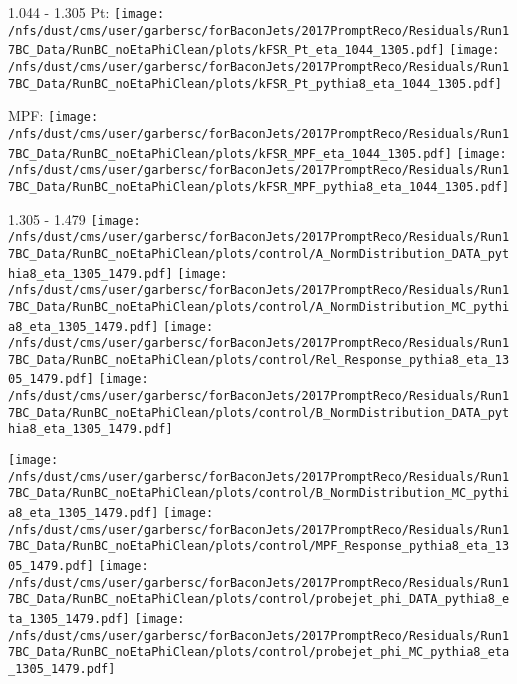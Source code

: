 \documentclass[t,compress]{beamer}
\begin{document}
\begin{frame}{1.044 - 1.305}
	 Pt: \texttt{[image: /nfs/dust/cms/user/garbersc/forBaconJets/2017PromptReco/Residuals/Run17BC\_Data/RunBC\_noEtaPhiClean/plots/kFSR\_Pt\_eta\_1044\_1305.pdf]}
	\texttt{[image: /nfs/dust/cms/user/garbersc/forBaconJets/2017PromptReco/Residuals/Run17BC\_Data/RunBC\_noEtaPhiClean/plots/kFSR\_Pt\_pythia8\_eta\_1044\_1305.pdf]}
\newline

	 MPF: \texttt{[image: /nfs/dust/cms/user/garbersc/forBaconJets/2017PromptReco/Residuals/Run17BC\_Data/RunBC\_noEtaPhiClean/plots/kFSR\_MPF\_eta\_1044\_1305.pdf]}
	\texttt{[image: /nfs/dust/cms/user/garbersc/forBaconJets/2017PromptReco/Residuals/Run17BC\_Data/RunBC\_noEtaPhiClean/plots/kFSR\_MPF\_pythia8\_eta\_1044\_1305.pdf]}
\end{frame}

\begin{frame}{1.305 - 1.479}
	\texttt{[image: /nfs/dust/cms/user/garbersc/forBaconJets/2017PromptReco/Residuals/Run17BC\_Data/RunBC\_noEtaPhiClean/plots/control/A\_NormDistribution\_DATA\_pythia8\_eta\_1305\_1479.pdf]}
	\texttt{[image: /nfs/dust/cms/user/garbersc/forBaconJets/2017PromptReco/Residuals/Run17BC\_Data/RunBC\_noEtaPhiClean/plots/control/A\_NormDistribution\_MC\_pythia8\_eta\_1305\_1479.pdf]}
	\texttt{[image: /nfs/dust/cms/user/garbersc/forBaconJets/2017PromptReco/Residuals/Run17BC\_Data/RunBC\_noEtaPhiClean/plots/control/Rel\_Response\_pythia8\_eta\_1305\_1479.pdf]}
	\texttt{[image: /nfs/dust/cms/user/garbersc/forBaconJets/2017PromptReco/Residuals/Run17BC\_Data/RunBC\_noEtaPhiClean/plots/control/B\_NormDistribution\_DATA\_pythia8\_eta\_1305\_1479.pdf]}
\newline

	\texttt{[image: /nfs/dust/cms/user/garbersc/forBaconJets/2017PromptReco/Residuals/Run17BC\_Data/RunBC\_noEtaPhiClean/plots/control/B\_NormDistribution\_MC\_pythia8\_eta\_1305\_1479.pdf]}
	\texttt{[image: /nfs/dust/cms/user/garbersc/forBaconJets/2017PromptReco/Residuals/Run17BC\_Data/RunBC\_noEtaPhiClean/plots/control/MPF\_Response\_pythia8\_eta\_1305\_1479.pdf]}
	\texttt{[image: /nfs/dust/cms/user/garbersc/forBaconJets/2017PromptReco/Residuals/Run17BC\_Data/RunBC\_noEtaPhiClean/plots/control/probejet\_phi\_DATA\_pythia8\_eta\_1305\_1479.pdf]}
	\texttt{[image: /nfs/dust/cms/user/garbersc/forBaconJets/2017PromptReco/Residuals/Run17BC\_Data/RunBC\_noEtaPhiClean/plots/control/probejet\_phi\_MC\_pythia8\_eta\_1305\_1479.pdf]}
\end{frame}
\end{document}
